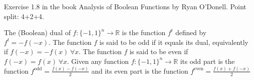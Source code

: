 \documentclass[12pt, a4paper, onecolumn]{exam}
\begin{document}
\begin{questions}
\begin{parts}
\begin{solution}
		\end{solution}

	\end{parts}

	\question[10] Exercise 1.8 in the book Analysis of Boolean Functions by Ryan O'Donell. Point split: 4+2+4.

	The (Boolean) dual of $f:\{-1,1\}^n\to \mathbb{R}$ is the function $f^{t}$
	defined by $f^{t} = - f(-x)$. The function $f$ is said to be odd if it equals
	its dual, equivalently if $f(-x) = -f(x) \: \forall x$. The function $f$ is
	said to be even if $f(-x) = f(x) \: \forall x$. Given any function
	$f:\{-1,1\}^n \to \mathbb{R}$ its odd part is the function $f^{\text{odd}} =
		\frac{f(x) - f(-x)}{2}$ and its even part is the function $f^{\text{even}} =
		\frac{f(x) + f(-x)}{2}$


	\question[10]
\end{questions}
\end{document}
